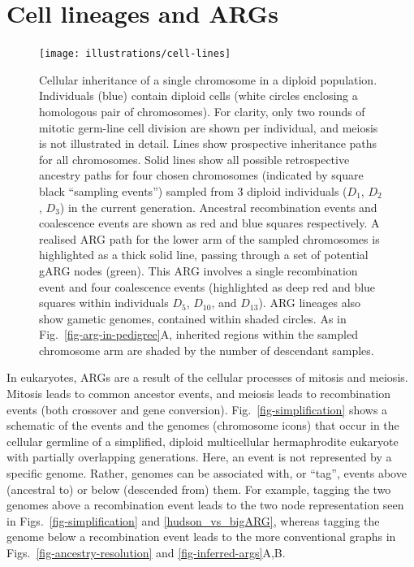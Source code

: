 \documentclass{article}
\begin{document}
\section{Cell lineages and ARGs}
\label{sec-cell-lineages-and-args}
\begin{figure}
\begin{center}
    \texttt{[image: illustrations/cell-lines]}
\end{center}
\caption{\label{fig-cell-lines}
Cellular inheritance of a single chromosome in a diploid population.
Individuals (blue) contain diploid cells (white circles enclosing a homologous pair of chromosomes).
For clarity, only two rounds of mitotic germ-line cell division are shown per individual, and
meiosis is not illustrated in detail.
Lines show prospective inheritance paths for all chromosomes. Solid lines show all possible
retrospective ancestry paths for four chosen chromosomes (indicated by square black ``sampling events'')
sampled from 3 diploid individuals ($D_1$, $D_2$, $D_3$) in the current generation.
Ancestral recombination events and coalescence events are shown as red and blue squares respectively.
A realised ARG path for the lower arm of the sampled chromosomes is highlighted as a
thick solid line, passing through a set of potential gARG nodes (green). This ARG
involves a single recombination event and four coalescence events
(highlighted as deep red and blue squares within individuals $D_5$, $D_{10}$, and $D_{13}$).
ARG lineages also show gametic genomes, contained within shaded circles.
As in Fig.~\ref{fig-arg-in-pedigree}A, inherited regions within the sampled chromosome arm are
shaded by the number of descendant samples.
}
\end{figure}

In eukaryotes, ARGs are a result of the cellular processes of mitosis and meiosis.
Mitosis leads to common ancestor events,
and meiosis leads to recombination events (both crossover and gene conversion).
Fig.~\ref{fig-simplification} shows a schematic of the events  and
the genomes (chromosome icons) that occur in the cellular
germline of a simplified, diploid multicellular
hermaphrodite eukaryote with partially overlapping generations.
Here, an event is not represented by a specific
genome. Rather, genomes can be associated with, or ``tag'', events above
(ancestral to) or below (descended from) them.
For example, tagging the two genomes above a recombination event leads to the
two node representation seen in
Figs.~\ref{fig-simplification} and \ref{hudson_vs_bigARG},
whereas tagging the genome
below a recombination event leads to the more
conventional graphs in Figs.~\ref{fig-ancestry-resolution} and \ref{fig-inferred-args}A,B.
\end{document}
